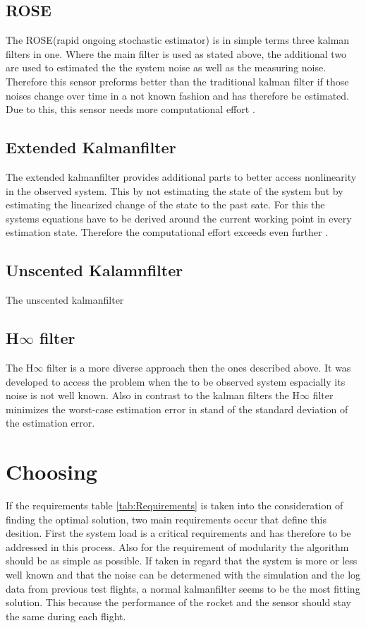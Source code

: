   \subsection{ROSE}
  The ROSE(rapid ongoing stochastic estimator) is in simple terms three kalman filters in one.
  Where the main filter is used as stated above, the additional two are used to estimated the 
  the system noise as well as the measuring noise. Therefore this sensor preforms better than the traditional kalman filter
  if those noises change over time in a not known fashion and has therefore be estimated.
  Due to this, this sensor needs more computational effort \cite{DavidWSchultz2004}. 
  
  \subsection{Extended Kalmanfilter}
  The extended kalmanfilter provides additional parts to better access nonlinearity in the observed system.
  This by not estimating the state of the system but by estimating the linearized change of the state 
  to the past sate. For this the systems equations have to be derived around the current working point in every estimation state.
  Therefore the computational effort exceeds even further \cite{SimonDan2006Ose:}.
  
  \subsection{Unscented Kalamnfilter}
  The unscented kalmanfilter 
  
  \subsection{H$\infty$ filter}
  The H$\infty$ filter is a more diverse approach then the ones described above.
  It was developed to access the problem when the to be observed system espacially its noise is not well known.
  Also in contrast to the kalman filters the H$\infty$ filter minimizes the worst-case estimation error 
  in stand of the standard deviation of the estimation error.
  
  \section{Choosing}
  If the requirements table \ref{tab:Requirements} is taken into the consideration of finding
  the optimal solution, two main requirements occur that define this desition.
  First the system load is a critical requirements and has therefore to be addressed in this process.
  Also for the requirement of modularity the algorithm should be as simple as possible.
  If taken in regard that the system is more or less well known and that the noise can be
  determened with the simulation and the log data from previous test flights,
  a normal kalmanfilter seems to be the most fitting solution.
  This because the performance of the rocket and the sensor should stay the same during
  each flight. 
  
